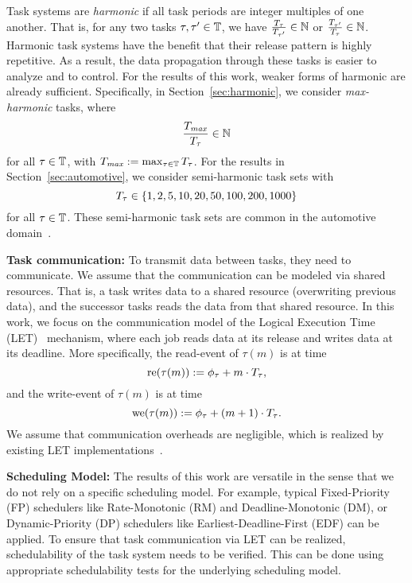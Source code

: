 \documentclass[10pt,conference]{resources/IEEEtran}
\theoremstyle{definition}
\theoremstyle{remark}
\theoremstyle{definition}
\begin{document}
	Task systems are \emph{harmonic} if all task periods are integer multiples of one another.
	That is, for any two tasks $\tau, \tau' \in \mathbb{T}$, we have $\frac{T_{\tau}}{T_{\tau'}} \in \mathbb{N}$ or $\frac{T_{\tau'}}{T_{\tau}} \in \mathbb{N}$.
	Harmonic task systems have the benefit that their release pattern is highly repetitive. As a result, the data propagation through these tasks is easier to analyze and to control.
	For the results of this work, weaker forms of harmonic are already sufficient.
	Specifically, in Section~\ref{sec:harmonic}, we consider \emph{max-harmonic} tasks, where 
	\begin{equation}
		\frac{T_{\mathit{max}}}{T_{\tau}} \in \mathbb{N}
	\end{equation}
	for all $\tau \in \mathbb{T}$, with $T_{\mathit{max}} := \max_{\tau\in \mathbb{T}} T_{\tau}$. 
	For the results in Section~\ref{sec:automotive}, we consider semi-harmonic task sets with 
	\begin{equation}
		T_\tau \in \left\{{1,2,5,10,20,50,100,200,1000}\right\}
	\end{equation}
	for all $\tau \in \mathbb{T}$.
	These semi-harmonic task sets are common in the automotive domain~\cite{kramer2015real}.

	\smallskip
	\textbf{Task communication:}
	To transmit data between tasks, they need to communicate. 
	We assume that the communication can be modeled via shared resources. 
	That is, a task writes data to a shared resource (overwriting previous data), and the successor tasks reads the data from that shared resource. 
	In this work, we focus on the communication model of the Logical Execution Time (LET)~\cite{DBLP:conf/birthday/KirschS12} mechanism, where each job reads data at its release and writes data at its deadline.
	More specifically, the read-event of $\tau(m)$ is at time 
	\begin{equation}
		\operatorname{re} (\tau(m)) := \phi_{\tau} + m \cdot T_{\tau},
	\end{equation}
	and the write-event of $\tau(m)$ is at time 
	\begin{equation}
		\operatorname{we} (\tau(m)) := \phi_{\tau} + (m+1) \cdot T_{\tau}.
	\end{equation}
	We assume that communication overheads are negligible, which is realized by existing LET implementations~\cite{Biondi2018LET, Bellassai2023JSA7}.
	
	\smallskip
	\textbf{Scheduling Model:}
	The results of this work are versatile in the sense that we do not rely on a specific scheduling model.
	For example, typical Fixed-Priority (FP) schedulers like Rate-Monotonic (RM) and Deadline-Monotonic (DM), or Dynamic-Priority (DP) schedulers like Earliest-Deadline-First (EDF) can be applied. 
	To ensure that task communication via LET can be realized, schedulability of the task system needs to be verified. 
	This can be done using appropriate schedulability tests for the underlying scheduling model.
\end{document}
